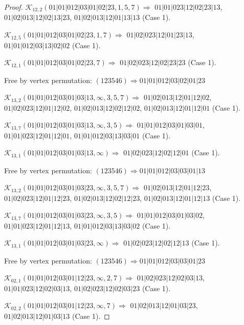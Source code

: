 \documentclass[12pt]{article}
\theoremstyle{plain}
\theoremstyle{definition}
\theoremstyle{remark}
\newcommand{\fancy}[1]{\mathcal{#1}}
\def\K{\fancy{K}}
\begin{document}
\begin{proof}
	
	\bigskip
	
	$\K_{12,2}(01|01|012|03|01|02|23,1, 5, 7)\Rightarrow $ $01|01|023|12|02|23|13$, $01|02|013|12|02|13|23$, $01|02|013|12|01|13|13$ (Case 1).
	
	$\K_{12,5}(01|01|012|03|01|02|23,1, 7)\Rightarrow $ $01|02|023|12|01|23|13$, $01|01|012|03|13|02|02$ (Case 1).
	
	$\K_{12,1}(01|01|012|03|01|02|23,7)\Rightarrow $ $01|02|023|12|02|23|23$ (Case 1).
	
	
	
	Free by vertex permutation: $(1 2 3 5 4 6)\Rightarrow 01|01|012|03|02|01|23$
	
	
	
	\bigskip
	
	$\K_{13,2}(01|01|012|03|01|03|13,\infty,3, 5, 7)\Rightarrow $ $01|02|013|12|01|12|02$, $01|02|023|12|01|12|02$, $01|02|013|12|02|12|02$, $01|02|013|12|01|12|01$ (Case 1).
	
	$\K_{13,7}(01|01|012|03|01|03|13,\infty,3, 5)\Rightarrow $ $01|01|012|03|01|03|01$, $01|01|023|12|01|12|01$, $01|01|012|03|13|03|01$ (Case 1).
	
	$\K_{13,1}(01|01|012|03|01|03|13,\infty)\Rightarrow $ $01|02|023|12|02|12|01$ (Case 1).
	
	
	
	Free by vertex permutation: $(1 2 3 5 4 6)\Rightarrow 01|01|012|03|03|01|13$
	
	
	
	\bigskip
	
	$\K_{13,2}(01|01|012|03|01|03|23,\infty,3, 5, 7)\Rightarrow $ $01|02|013|12|01|12|23$, $01|02|023|12|01|12|23$, $01|02|013|12|02|12|23$, $01|02|013|12|01|12|13$ (Case 1).
	
	$\K_{13,7}(01|01|012|03|01|03|23,\infty,3, 5)\Rightarrow $ $01|01|012|03|01|03|02$, $01|01|023|12|01|12|13$, $01|01|012|03|13|03|02$ (Case 1).
	
	$\K_{13,1}(01|01|012|03|01|03|23,\infty)\Rightarrow $ $01|02|023|12|02|12|13$ (Case 1).
	
	
	
	Free by vertex permutation: $(1 2 3 5 4 6)\Rightarrow 01|01|012|03|03|01|23$
	
	
	
	\bigskip
	
	$\K_{02,1}(01|01|012|03|01|12|23,\infty,2, 7)\Rightarrow $ $01|02|023|12|02|03|13$, $01|01|023|12|02|03|13$, $01|02|023|12|02|03|23$ (Case 1).
	
	$\K_{02,2}(01|01|012|03|01|12|23,\infty,7)\Rightarrow $ $01|02|013|12|01|03|23$, $01|02|013|12|01|03|13$ (Case 1).
	

\end{proof}
\end{document}
